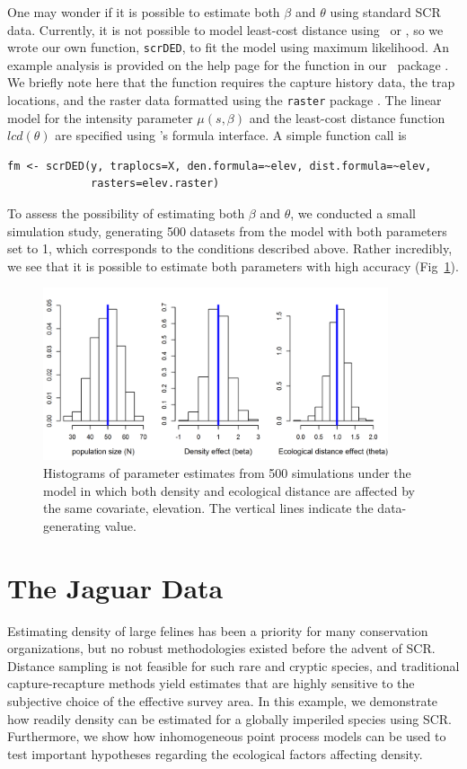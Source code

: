 One may wonder if it is possible to estimate both $\beta$
and $\theta$ using standard SCR data. Currently, it is not possible to
model least-cost distance using \jags~or \secr, so we wrote our own
function, \verb+scrDED+, to fit the model using maximum likelihood. An
example analysis is provided on the help page for the function in our
\R~package \scrbook. We briefly note here that the function requires
the capture history data, the trap locations, and the raster data
formatted using the {\tt raster} package
\citep{hijmans_vanetten:2012}. The linear model for the
intensity parameter $\mu(s, \beta)$ and the least-cost distance
function $lcd(\theta)$ are specified using \R's formula interface. A
simple function call is
\begin{verbatim}
fm <- scrDED(y, traplocs=X, den.formula=~elev, dist.formula=~elev,
             rasters=elev.raster)
\end{verbatim}
To assess the possibility of estimating both $\beta$ and $\theta$, we
conducted a small simulation study, generating 500 datasets from the
model with both parameters set to 1, which corresponds to the
conditions described above. Rather incredibly, we see that it is
possible to estimate both parameters with high accuracy
(Fig~\ref{ch9.fig.sim}).

\begin{figure}[ht]
\centering
\includegraphics[width=4in,height=2in]{Ch11/figs/scrDEDsim}
\caption{Histograms of parameter estimates from 500 simulations under
  the model in which both density and ecological distance are affected
by the same covariate, elevation. The vertical lines indicate the
data-generating value.}
\label{ch9.fig.sim}
\end{figure}



\section{The Jaguar Data}

Estimating density of large felines has been a priority for many
conservation organizations, but no robust methodologies existed before
the advent of SCR. Distance sampling is not feasible for such rare and
cryptic species, and traditional capture-recapture methods yield
estimates that are highly sensitive to the subjective choice of the
effective survey area. In this example, we
demonstrate how readily density can be estimated for a
globally imperiled species using SCR. Furthermore, we show how
inhomogeneous point process models can be used to test important
hypotheses regarding the ecological factors affecting density.

